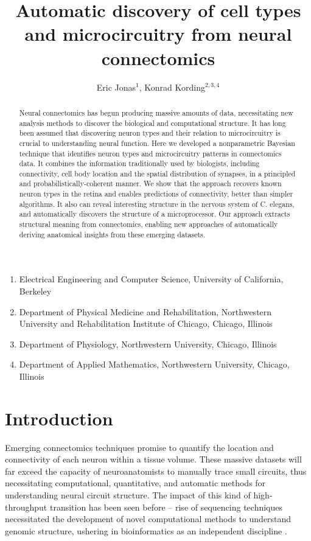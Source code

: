 \documentclass{article}
\title{Automatic discovery of cell types and microcircuitry from neural connectomics}
\author{Eric Jonas$^1$, Konrad Kording$^{2, 3,4}$}
\begin{document}
\maketitle

\begin{small}
\begin{enumerate}
  \item Electrical Engineering and Computer Science, University of California, Berkeley
  \item Department of Physical Medicine and Rehabilitation,
    Northwestern University and Rehabilitation Institute of Chicago,
    Chicago, Illinois
  \item Department of Physiology, Northwestern University, Chicago, Illinois
  \item Department of Applied Mathematics, Northwestern University, Chicago, Illinois
\end{enumerate}
\end{small}

\begin{abstract}
  Neural connectomics has begun producing massive amounts of data,
  necessitating new analysis methods to discover the biological and
  computational structure. It has long been assumed that discovering
  neuron types and their relation to microcircuitry is crucial to
  understanding neural function. Here we developed a nonparametric
  Bayesian technique that identifies neuron types and microcircuitry
  patterns in connectomics data. It combines the information
  traditionally used by biologists, including connectivity, cell body
  location and the spatial distribution of synapses, in a
  principled and probabilistically-coherent manner. We show that the
  approach recovers known neuron types in the retina and enables
  predictions of connectivity, better than simpler algorithms. It also
  can reveal interesting structure in the nervous system of
  C. elegans, and automatically discovers the structure of a
  microprocessor.  Our approach extracts structural meaning from
  connectomics, enabling new approaches of automatically deriving
  anatomical insights from these emerging datasets.
\end{abstract}


\section*{Introduction}
Emerging connectomics techniques \autocite{Morgan2013,Zador2012}
promise to quantify the location and connectivity of each neuron
within a tissue volume. These massive datasets will far exceed the
capacity of neuroanatomists to manually trace small circuits, thus
necessitating computational, quantitative, and automatic methods for
understanding neural circuit structure.  The impact of this kind of
high-throughput transition has been seen before -- rise of sequencing
techniques necessitated the development of novel computational methods
to understand genomic structure, ushering in  bioinformatics
as an independent discipline \autocite{Koboldt2013}.
\end{document}
